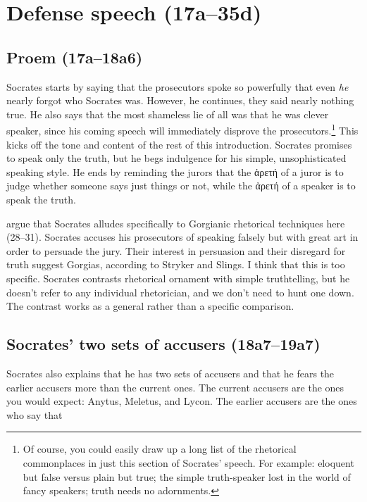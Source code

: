 \documentclass[11pt]{article}
\begin{document}

\section{Defense speech (17a--35d)}

\subsection{Proem (17a--18a6)}

Socrates starts by saying that the prosecutors spoke so powerfully that even \emph{he} nearly forgot who Socrates was.  However, he continues, they said nearly nothing true.   He also says that the most shameless lie of all was that he was clever speaker, since his coming speech will immediately disprove the prosecutors.\footnote{Of course, you could easily draw up a long list of the rhetorical commonplaces in just this section of Socrates' speech.  For example: eloquent but false versus plain but true; the simple truth-speaker lost in the world of fancy speakers; truth needs no adornments.}  This kicks off the tone and content of the rest of this introduction.  Socrates promises to speak only the truth, but he begs indulgence for his simple, unsophisticated speaking style.  He ends by reminding the jurors that the {\g ἀρετή} of a juror is to judge whether someone says just things or not, while the {\g ἀρετή} of a speaker is to speak the truth.

\citet{stryckerslings1994} argue that Socrates alludes specifically to Gorgianic rhetorical techniques here (28--31).  Socrates accuses his prosecutors of speaking falsely but with great art in order to persuade the jury. Their interest in persuasion and their disregard for truth suggest Gorgias, according to Stryker and Slings.  I think that this is too specific.  Socrates contrasts rhetorical ornament with simple truthtelling, but he doesn't refer to any individual rhetorician, and we don't need to hunt one down.  The contrast works as a general rather than a specific comparison.


\subsection{Socrates' two sets of accusers (18a7--19a7)}

Socrates also explains that he has two sets of accusers and that he fears the earlier accusers more than the current ones.  The current accusers are the ones you would expect: Anytus, Meletus, and Lycon.  The earlier accusers are the ones who say that
\end{document}
